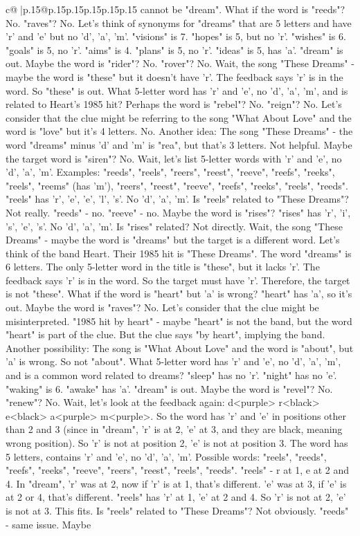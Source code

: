 \documentclass{article}
\begin{document}
{\begin{supertabular}{c@{$\;$}|p{.15\linewidth}@{}p{.15\linewidth}p{.15\linewidth}p{.15\linewidth}p{.15\linewidth}p{.15\linewidth}}
{{{cannot be "dream". What if the word is "reeds"? No. "raves"? No. Let's think of synonyms for "dreams" that are 5 letters and have 'r' and 'e' but no 'd', 'a', 'm'. "visions" is 7. "hopes" is 5, but no 'r'. "wishes" is 6. "goals" is 5, no 'r'. "aims" is 4. "plans" is 5, no 'r'. "ideas" is 5, has 'a'. "dream" is out. Maybe the word is "rider"? No. "rover"? No. Wait, the song "These Dreams" {-} maybe the word is "these" but it doesn't have 'r'. The feedback says 'r' is in the word. So "these" is out. What 5{-}letter word has 'r' and 'e', no 'd', 'a', 'm', and is related to Heart's 1985 hit? Perhaps the word is "rebel"? No. "reign"? No. Let's consider that the clue might be referring to the song "What About Love" and the word is "love" but it's 4 letters. No. Another idea: The song "These Dreams" {-} the word "dreams" minus 'd' and 'm' is "rea", but that's 3 letters. Not helpful. Maybe the target word is "siren"? No. Wait, let's list 5{-}letter words with 'r' and 'e', no 'd', 'a', 'm'. Examples: "reeds", "reels", "reers", "reest", "reeve", "reefs", "reeks", "reels", "reems" (has 'm'), "reers", "reest", "reeve", "reefs", "reeks", "reels", "reeds". "reels" has 'r', 'e', 'e', 'l', 's'. No 'd', 'a', 'm'. Is "reels" related to "These Dreams"? Not really. "reeds" {-} no. "reeve" {-} no. Maybe the word is "rises"? "rises" has 'r', 'i', 's', 'e', 's'. No 'd', 'a', 'm'. Is "rises" related? Not directly. Wait, the song "These Dreams" {-} maybe the word is "dreams" but the target is a different word. Let's think of the band Heart. Their 1985 hit is "These Dreams". The word "dreams" is 6 letters. The only 5{-}letter word in the title is "these", but it lacks 'r'. The feedback says 'r' is in the word. So the target must have 'r'. Therefore, the target is not "these". What if the word is "heart" but 'a' is wrong? "heart" has 'a', so it's out. Maybe the word is "raves"? No. Let's consider that the clue might be misinterpreted. "1985 hit by heart" {-} maybe "heart" is not the band, but the word "heart" is part of the clue. But the clue says "by heart", implying the band. Another possibility: The song is "What About Love" and the word is "about", but 'a' is wrong. So not "about". What 5{-}letter word has 'r' and 'e', no 'd', 'a', 'm', and is a common word related to dreams? "sleep" has no 'r'. "night" has no 'e'. "waking" is 6. "awake" has 'a'. "dream" is out. Maybe the word is "revel"? No. "renew"? No. Wait, let's look at the feedback again: d<purple> r<black> e<black> a<purple> m<purple>. So the word has 'r' and 'e' in positions other than 2 and 3 (since in "dream", 'r' is at 2, 'e' at 3, and they are black, meaning wrong position). So 'r' is not at position 2, 'e' is not at position 3. The word has 5 letters, contains 'r' and 'e', no 'd', 'a', 'm'. Possible words: "reels", "reeds", "reefs", "reeks", "reeve", "reers", "reest", "reels", "reeds". "reels" {-} r at 1, e at 2 and 4. In "dream", 'r' was at 2, now if 'r' is at 1, that's different. 'e' was at 3, if 'e' is at 2 or 4, that's different. "reels" has 'r' at 1, 'e' at 2 and 4. So 'r' is not at 2, 'e' is not at 3. This fits. Is "reels" related to "These Dreams"? Not obviously. "reeds" {-} same issue. Maybe }}}
\end{supertabular}}
\end{document}

